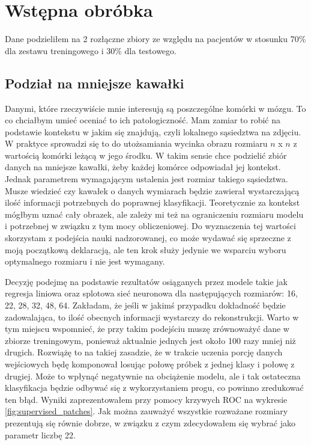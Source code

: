 \section{Wstępna obróbka}

Dane podzieliłem na 2 rozłączne zbiory ze względu na pacjentów w stosunku 70\% dla zestawu treningowego i 30\% dla testowego.

\subsection{Podział na mniejsze kawałki}

Danymi, które rzeczywiście mnie interesują są poszczególne komórki w mózgu. To co chciałbym umieć oceniać to ich patologiczność. Mam zamiar to robić na podstawie kontekstu w jakim się znajdują, czyli lokalnego sąsiedztwa na zdjęciu. W praktyce sprowadzi się to do utożsamiania wycinka obrazu rozmiaru $n$ x $n$ z wartością komórki leżącą w jego środku. W takim sensie chce podzielić zbiór danych na mniejsze kawałki, żeby każdej komórce odpowiadał jej kontekst. Jednak parametrem wymagającym ustalenia jest rozmiar takiego sąsiedztwa. Musze wiedzieć czy kawałek o danych wymiarach będzie zawierał wystarczającą ilość informacji potrzebnych do poprawnej klasyfikacji. Teoretycznie za kontekst mógłbym uznać cały obrazek, ale zależy mi też na ograniczeniu rozmiaru modelu i potrzebnej w związku z tym mocy obliczeniowej. Do wyznaczenia tej wartości skorzystam z podejścia nauki nadzorowanej, co może wydawać się sprzeczne z moją początkową deklaracją, ale ten krok służy jedynie we wsparciu wyboru optymalnego rozmiaru i nie jest wymagany.

Decyzję podejmę na podstawie rezultatów osiąganych przez modele takie jak regresja liniowa oraz splotowa sieć neuronowa dla następujących rozmiarów: 16, 22, 28, 32, 48, 64. Zakładam, że jeśli w jakimś przypadku dokładność będzie zadowalająca, to ilość obecnych informacji wystarczy do rekonstrukcji. Warto w tym miejscu wspomnieć, że przy takim podejściu muszę zrównoważyć dane w zbiorze treningowym, ponieważ aktualnie jednych jest około 100 razy mniej niż drugich. Rozwiążę to na takiej zasadzie, że w trakcie uczenia porcję danych wejściowych będę komponował losując połowę próbek z jednej klasy i połowę z drugiej. Może to wpłynąć negatywnie na obciążenie modelu, ale i tak ostateczna klasyfikacja będzie odbywać się z wykorzystaniem progu, co powinno zredukować ten błąd. Wyniki zaprezentowałem przy pomocy krzywych ROC na wykresie \ref{fig:supervised_patches}. Jak można zauważyć wszystkie rozważane rozmiary prezentują się równie dobrze, w związku z czym zdecydowałem się wybrać jako parametr liczbę 22.

